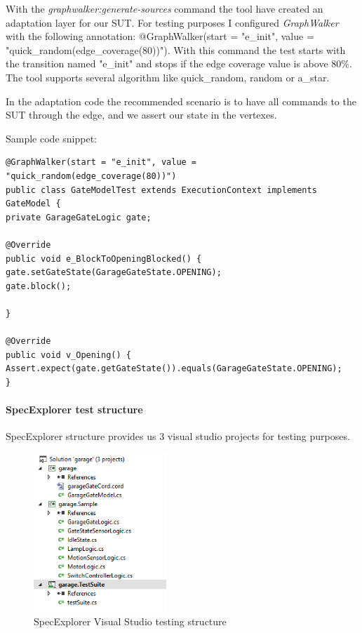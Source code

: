 With the \textit{graphwalker:generate-sources} command the tool have created an adaptation layer for our SUT. For testing purposes I configured \textit{GraphWalker} with the following annotation:
@GraphWalker(start = "e\_init", value = "quick\_random(edge\_coverage(80))").
With this command the test starts with the transition named "e\_init" and stops if the edge coverage value is above 80\%.
The tool supports several algorithm like quick\_random, random or a\_star.

In the adaptation code the recommended scenario is to have all commands to the SUT through the edge, and we assert our state in the vertexes.
\begin{minipage}{\linewidth}

Sample code snippet:
\begin{lstlisting}
@GraphWalker(start = "e_init", value = "quick_random(edge_coverage(80))")
public class GateModelTest extends ExecutionContext implements GateModel {
private GarageGateLogic gate;

@Override
public void e_BlockToOpeningBlocked() {
gate.setGateState(GarageGateState.OPENING);
gate.block();

}

@Override
public void v_Opening() {
Assert.expect(gate.getGateState()).equals(GarageGateState.OPENING);
}
\end{lstlisting}
\end{minipage}

\paragraph{SpecExplorer test structure}
SpecExplorer structure provides us 3 visual studio projects for testing purposes.
\begin{figure}[!ht]
	\centering
	\includegraphics[width=50mm, keepaspectratio]{figures/specexplorerStructure.png}
	\caption{SpecExplorer Visual Studio testing structure}
	\label{fig:SpecExplorer Structure}
\end{figure}

